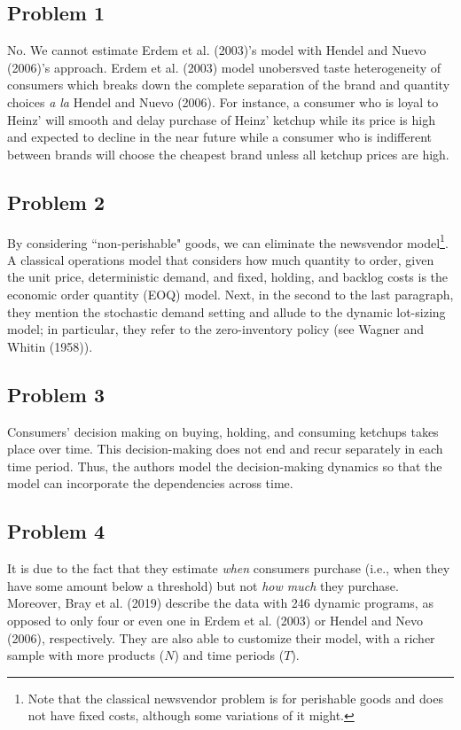 \documentclass{article}
\begin{document}
\subsection*{Problem 1}
No. We cannot estimate Erdem et al. (2003)'s model with Hendel and Nuevo (2006)'s approach. Erdem et al. (2003) model unobersved taste heterogeneity of consumers which breaks down the complete separation of the brand and quantity choices \textit{a la} Hendel and Nuevo (2006). For instance, a consumer who is loyal to Heinz' will smooth and delay purchase of Heinz' ketchup while its price is high and expected to decline in the near future while a consumer who is indifferent between brands will choose the cheapest brand unless all ketchup prices are high.


\subsection*{Problem 2}
By considering ``non-perishable" goods, we can eliminate the newsvendor model\footnote{Note that the classical newsvendor problem is for perishable goods and does not have fixed costs, although some variations of it might.}. A classical operations model that considers how much quantity to order, given the unit price, deterministic demand, and fixed, holding, and backlog costs is the economic order quantity (EOQ) model. Next, in the second to the last paragraph, they mention the stochastic demand setting and allude to the dynamic lot-sizing model; in particular, they refer to the zero-inventory policy (see Wagner and Whitin (1958)).

\subsection*{Problem 3}
Consumers' decision making on buying, holding, and consuming ketchups takes place over time. This decision-making does not end and recur separately in each time period. Thus, the authors model the decision-making dynamics so that the model can incorporate the dependencies across time.

\subsection*{Problem 4}
It is due to the fact that they estimate \textit{when} consumers purchase (i.e., when they have some amount below a threshold) but not \textit{how much} they purchase. Moreover, Bray et al. (2019) describe the data with 246 dynamic programs, as opposed to only four or even one in Erdem et al. (2003) or Hendel and Nevo (2006), respectively. They are also able to customize their model, with a richer sample with more products ($N$) and time periods ($T$). 
\end{document}
